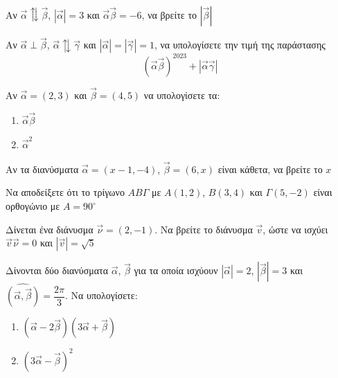 \documentclass{../../presentation}
\begin{document}
\begin{askisi}
  Αν $\vec{α}\updownarrows\vec{β}$, $|\vec{α}|=3$ και $\vec{α}\vec{β}=-6$, να βρείτε το $|\vec{β}|$

\end{askisi}

\begin{askisi}
  Αν $\vec{α}\perp\vec{β}$, $\vec{α}\updownarrows\vec{γ}$ και $|\vec{α}|=|\vec{γ}|=1$, να υπολογίσετε την τιμή της παράστασης
  $$(\vec{α}\vec{β})^{2023}+|\vec{α}\vec{γ}|$$

\end{askisi}

\begin{askisi}
  Αν $\vec{α}=(2,3)$ και $\vec{β}=(4,5)$ να υπολογίσετε τα:
  \begin{enumerate}
    \item<1-> $\vec{α}\vec{β}$
    \item<2-> $\vec{α}^2$
  \end{enumerate}

\end{askisi}

\begin{askisi}
  Αν τα διανύσματα $\vec{α}=(x-1,-4)$, $\vec{β}=(6,x)$ είναι κάθετα, να βρείτε το $x$


\end{askisi}

\begin{askisi}
  Να αποδείξετε ότι το τρίγωνο $ΑΒΓ$ με $Α(1,2)$, $Β(3,4)$ και $Γ(5,-2)$ είναι ορθογώνιο με $Α=90^{\circ}$
\end{askisi}

\begin{askisi}
  Δίνεται ένα διάνυσμα $\vec{\nu}=(2,-1)$. Να βρείτε το διάνυσμα $\vec{v}$, ώστε να ισχύει $\vec{v}\vec{\nu}=0$ και $|\vec{v}|=\sqrt{5}$
\end{askisi}

\begin{askisi}
  Δίνονται δύο διανύσματα $\vec{α}$, $\vec{β}$ για τα οποία ισχύουν $|\vec{α}|=2$, $|\vec{β}|=3$ και $\widehat{(\vec{α }, \vec{β })}=\dfrac{2\pi}{3}$. Να υπολογίσετε:
  \begin{enumerate}
    \item<1-> $(\vec{α}-2\vec{β})(3\vec{α}+\vec{β})$
    \item<2-> $(3\vec{α}-\vec{β})^2$
  \end{enumerate}


\end{askisi}
\end{document}
